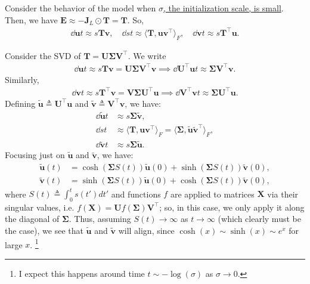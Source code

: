 \documentclass{article}
\begin{document}
Consider the behavior of the model when \underline{$\sigma$, the initialization scale, is small}.
Then, we have $\bm{E} \approx - \bm{J}_L \odot \bm{T} = \bm{T}$.
So,
\begin{align*}
    \dd{\bm{u}}{t} \approx s \bm{T} \bm{v}, \quad
    \dd{s}{t} \approx \langle \bm{T}, \bm{u} \bm{v}^\top \rangle_F, \quad
    \dd{\bm{v}}{t} \approx s \bm{T}^\top \bm{u}.
\end{align*}

Consider the SVD of $\bm{T} = \bm{U} \bm{\Sigma} \bm{V}^\top$.
We write
\begin{align*}
    \dd{\bm{u}}{t} \approx s \bm{T} \bm{v}
    = \bm{U} \bm{\Sigma} \bm{V}^\top \bm{v}
    \implies
    \dd{\bm{U}^\top \bm{u}}{t} \approx \bm{\Sigma} \bm{V}^\top \bm{v}.
\end{align*}
Similarly,
\begin{align*}
    \dd{\bm{v}}{t} \approx s \bm{T}^\top \bm{v}
    = \bm{V} \bm{\Sigma} \bm{U}^\top \bm{u}
    \implies
    \dd{\bm{V}^\top \bm{v}}{t} \approx \bm{\Sigma} \bm{U}^\top \bm{u}.
\end{align*}
Defining $\tilde{\bm{u}} \triangleq \bm{U}^\top \bm{u}$ and $\tilde{\bm{v}} \triangleq \bm{V}^\top \bm{v}$, we have:
\begin{align*}
    \dd{\tilde{\bm{u}}}{t} &\approx s \bm{\Sigma} \tilde{\bm{v}}, \\
    \dd{s}{t} &\approx \langle \bm{T}, \bm{u} \bm{v}^\top \rangle_F = \langle \bm{\Sigma}, \tilde{\bm{u}} \tilde{\bm{v}}^\top \rangle_F, \\
    \dd{\tilde{\bm{v}}}{t} &\approx s \bm{\Sigma} \tilde{\bm{u}}.
\end{align*}
Focusing just on $\tilde{\bm{u}}$ and $\tilde{\bm{v}}$, we have:
\begin{align*}
    \tilde{\bm{u}}(t) &= \cosh( \bm{\Sigma} S(t) ) \tilde{\bm{u}}(0) + \sinh( \bm{\Sigma} S(t) ) \tilde{\bm{v}}(0), \\
    \tilde{\bm{v}}(t) &= \sinh( \bm{\Sigma} S(t) ) \tilde{\bm{u}}(0) + \cosh( \bm{\Sigma} S(t) ) \tilde{\bm{v}}(0),
\end{align*}
where $S(t) \triangleq \int_0^t s(t') dt'$ and functions $f$ are applied to matrices $\bm{X}$ via their singular values, i.e. $f(\bm{X}) = \bm{U} f(\bm{\Sigma}) \bm{V}^\top$; so, in this case, we only apply it along the diagonal of $\bm{\Sigma}$.
Thus, assuming $S(t) \to \infty$ as $t \to \infty$ (which clearly must be the case), we see that $\tilde{\bm{u}}$ and $\tilde{\bm{v}}$ will align, since $\cosh(x) \sim \sinh(x) \sim e^x$ for large $x$.
\footnote{I expect this happens around time $t \sim - \log(\sigma)$ as $\sigma \to 0$.}
\end{document}
